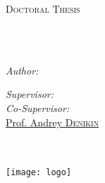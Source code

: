 \documentclass[
12pt, %
oneside, %
english, %
onehalfspacing, %
onehalfspacing, %
headsepline, %
]{MastersDoctoralThesis} %
\author{Bakytzhan \textsc{Urazbekov}} %
\begin{document}
\frontmatter %

\pagestyle{plain} %


\begin{titlepage}
\begin{center}

{\scshape\LARGE \univname\par}\vspace{1.5cm} %
\textsc{\Large Doctoral Thesis}\\[0.5cm] %

\HRule \\[0.4cm] %
{\huge \bfseries \ttitle\par}\vspace{0.4cm} %
\HRule \\[1.5cm] %
 
\begin{minipage}[t]{0.4\textwidth}
\begin{flushleft} \large
\emph{Author:}\\
\href{https://www.researchgate.net/profile/Bakytzhan_Urazbekov}{\authorname} %
\end{flushleft}
\end{minipage}
\begin{minipage}[t]{0.4\textwidth}
\begin{flushright} \large
\emph{Supervisor:} \\
\href{https://www.researchgate.net/profile/Nunzio_Itaco}{\supname} %
\emph{Co-Supervisor:} \\
\href{https://www.researchgate.net/profile/A_Denikin}{Prof. Andrey \textsc{Denikin}} %
\end{flushright}
\end{minipage}
\\[3cm] 

\deptname
\\[1cm] %
 

\texttt{[image: logo]} %
 
\end{center}
\end{titlepage}
\end{document}
